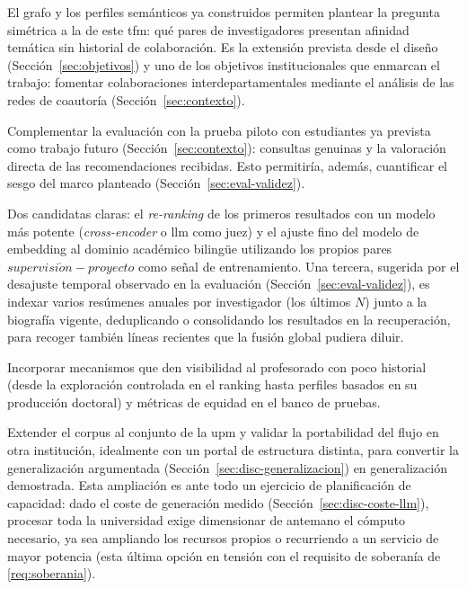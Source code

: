 \begin{mydescription}
    \item[Detección de colaboraciones entre investigadores.]
    El grafo y los perfiles semánticos ya construidos permiten plantear la pregunta simétrica a la de este \gls{tfm}: qué pares de investigadores presentan afinidad temática sin historial de colaboración.
    Es la extensión prevista desde el diseño (Sección~\ref{sec:objetivos}) y uno de los objetivos institucionales que enmarcan el trabajo: fomentar colaboraciones interdepartamentales mediante el análisis de las redes de coautoría (Sección~\ref{sec:contexto}).
    \item[Evaluación con usuarios reales.]
    Complementar la evaluación con la prueba piloto con estudiantes ya prevista como trabajo futuro (Sección~\ref{sec:contexto}): consultas genuinas y la valoración directa de las recomendaciones recibidas.
    Esto permitiría, además, cuantificar el sesgo del marco planteado (Sección~\ref{sec:eval-validez}).
    \item[Mejoras de recuperación.]
    Dos candidatas claras: el \emph{re-ranking} de los primeros resultados con un modelo más potente (\emph{cross-encoder} o \gls{llm} como juez) y el ajuste fino del modelo de embedding al dominio académico bilingüe utilizando los propios pares $supervisi\acute{o}n-proyecto$ como señal de entrenamiento.
    Una tercera, sugerida por el desajuste temporal observado en la evaluación (Sección~\ref{sec:eval-validez}), es indexar varios resúmenes anuales por investigador (los últimos $N$) junto a la biografía vigente, deduplicando o consolidando los resultados en la recuperación, para recoger también líneas recientes que la fusión global pudiera diluir.
    \item[Equidad y arranque en frío.]
    Incorporar mecanismos que den visibilidad al profesorado con poco historial (desde la exploración controlada en el ranking hasta perfiles basados en su producción doctoral) y métricas de equidad en el banco de pruebas.
    \item[Ampliación del perímetro.]
    Extender el corpus al conjunto de la \gls{upm} y validar la portabilidad del flujo en otra institución, idealmente con un portal de estructura distinta, para convertir la generalización argumentada (Sección~\ref{sec:disc-generalizacion}) en generalización demostrada.
    Esta ampliación es ante todo un ejercicio de planificación de capacidad: dado el coste de generación medido (Sección~\ref{sec:disc-coste-llm}), procesar toda la universidad exige dimensionar de antemano el cómputo necesario, ya sea ampliando los recursos propios o recurriendo a un servicio de mayor potencia (esta última opción en tensión con el requisito de soberanía de \ref{req:soberania}).

\end{mydescription}
